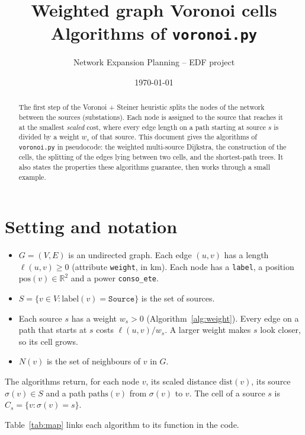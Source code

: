 \documentclass[11pt,a4paper]{article}
\title{Weighted graph Voronoi cells\\[2pt]
\large Algorithms of \texttt{voronoi.py}}
\author{Network Expansion Planning -- EDF project}
\date{\today}
\theoremstyle{remark}
\newcommand{\dist}{\mathrm{dist}}
\newcommand{\paths}{\mathrm{paths}}
\begin{document}
\maketitle

\begin{abstract}
The first step of the Voronoi + Steiner heuristic splits the nodes of the
network between the sources (substations). Each node is assigned to the source
that reaches it at the smallest \emph{scaled} cost, where every edge length on
a path starting at source $s$ is divided by a weight $w_s$ of that source.
This document gives the algorithms of \texttt{voronoi.py} in pseudocode: the
weighted multi-source Dijkstra, the construction of the cells, the splitting of
the edges lying between two cells, and the shortest-path trees. It also states
the properties these algorithms guarantee, then works through a small example.
\end{abstract}

\section{Setting and notation}

\begin{itemize}
  \item $G=(V,E)$ is an undirected graph. Each edge $(u,v)$ has a length
        $\ell(u,v)\ge 0$ (attribute \texttt{weight}, in km). Each node has a
        \texttt{label}, a position $\mathrm{pos}(v)\in\mathbb{R}^2$ and a power
        \texttt{conso\_ete}.
  \item $S=\{v\in V : \mathrm{label}(v)=\texttt{Source}\}$ is the set of sources.
  \item Each source $s$ has a weight $w_s>0$ (Algorithm~\ref{alg:weight}). Every
        edge on a path that starts at $s$ costs $\ell(u,v)/w_s$. A larger
        weight makes $s$ look closer, so its cell grows.
  \item $N(v)$ is the set of neighbours of $v$ in $G$.
\end{itemize}

The algorithms return, for each node $v$, its scaled distance $\dist(v)$, its
source $\sigma(v)\in S$ and a path $\paths(v)$ from $\sigma(v)$ to $v$. The cell
of a source $s$ is $C_s=\{v : \sigma(v)=s\}$.

Table~\ref{tab:map} links each algorithm to its function in the code.
\end{document}
